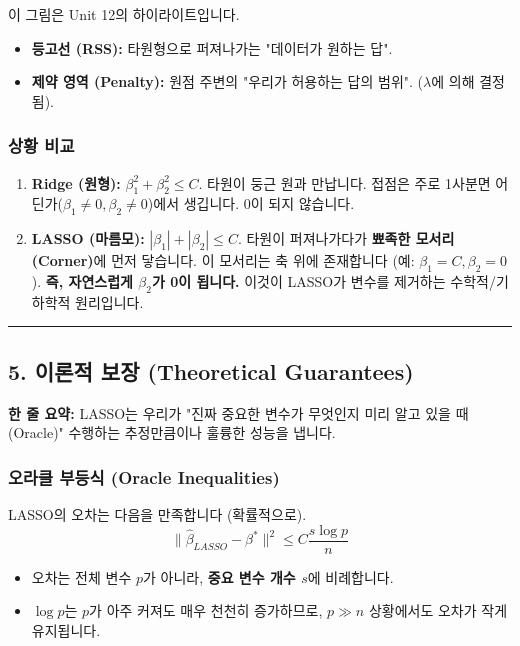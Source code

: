 \documentclass[11pt,a4paper]{book}
\theoremstyle{definition}
\begin{document}
이 그림은 Unit 12의 하이라이트입니다.
\begin{itemize}
    \item \textbf{등고선 (RSS):} 타원형으로 퍼져나가는 "데이터가 원하는 답".
    \item \textbf{제약 영역 (Penalty):} 원점 주변의 "우리가 허용하는 답의 범위". ($\lambda$에 의해 결정됨).
\end{itemize}

\subsubsection*{상황 비교}
\begin{enumerate}
    \item \textbf{Ridge (원형):} $\beta_1^2 + \beta_2^2 \le C$.
    타원이 둥근 원과 만납니다. 접점은 주로 1사분면 어딘가($\beta_1 \neq 0, \beta_2 \neq 0$)에서 생깁니다. 0이 되지 않습니다.
    
    \item \textbf{LASSO (마름모):} $|\beta_1| + |\beta_2| \le C$.
    타원이 퍼져나가다가 \textbf{뾰족한 모서리(Corner)}에 먼저 닿습니다.
    이 모서리는 축 위에 존재합니다 (예: $\beta_1=C, \beta_2=0$).
    \textbf{즉, 자연스럽게 $\beta_2$가 0이 됩니다.} 이것이 LASSO가 변수를 제거하는 수학적/기하학적 원리입니다.
\end{enumerate}

\vspace{0.5cm}\hrule\vspace{0.5cm}

\subsection{5. 이론적 보장 (Theoretical Guarantees)}

\begin{conceptbox}[title={개념 5: 신(Oracle)과의 대결}]
\textbf{한 줄 요약:} LASSO는 우리가 "진짜 중요한 변수가 무엇인지 미리 알고 있을 때(Oracle)" 수행하는 추정만큼이나 훌륭한 성능을 냅니다.
\end{conceptbox}

\subsubsection*{오라클 부등식 (Oracle Inequalities)}
LASSO의 오차는 다음을 만족합니다 (확률적으로).
$$ \| \hat{\beta}_{LASSO} - \beta^* \|^2 \le C \frac{s \log p}{n} $$
\begin{itemize}
    \item 오차는 전체 변수 $p$가 아니라, \textbf{중요 변수 개수 $s$}에 비례합니다.
    \item $\log p$는 $p$가 아주 커져도 매우 천천히 증가하므로, $p \gg n$ 상황에서도 오차가 작게 유지됩니다.
\end{itemize}
\end{document}
